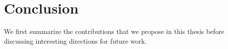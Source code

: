 
\chapter{Conclusion}
\label{chapter:conclusion}

\acresetall
{}


We first summarize the contributions that we propose in this thesis before discussing interesting directions for future work. %


